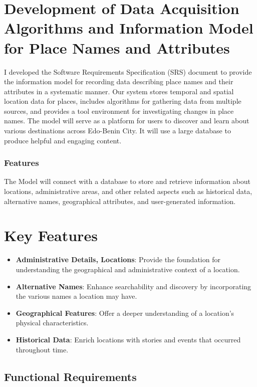 \section{Development of Data Acquisition Algorithms and Information Model for Place Names and Attributes}
I developed the Software Requirements Specification (SRS) document to provide the information model for recording data describing place names and their attributes in a systematic manner. Our system stores temporal and spatial location data for places, includes algorithms for gathering data from multiple sources, and provides a tool environment for investigating changes in place names.
The model will serve as a platform for users to discover and learn about various destinations across Edo-Benin City. It will use a large database to produce helpful and engaging content.
\subsubsection{Features}
The Model will connect with a database to store and retrieve information about locations, administrative areas, and other related aspects such as historical data, alternative names, geographical attributes, and user-generated information.

\section*{Key Features}

\begin{itemize}
    \item \textbf{Administrative Details, Locations}: Provide the foundation for understanding the geographical and administrative context of a location.
    \item \textbf{Alternative Names}: Enhance searchability and discovery by incorporating the various names a location may have.
    \item \textbf{Geographical Features}: Offer a deeper understanding of a location's physical characteristics.
    \item \textbf{Historical Data}: Enrich locations with stories and events that occurred throughout time.
\end{itemize}

\subsection*{Functional Requirements}

